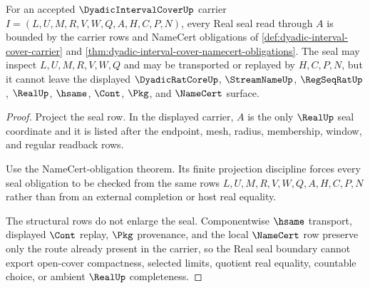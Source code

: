 \begin{theorem}
\label{thm:dyadic-interval-cover-real-seal-boundary}
For an accepted $\DyadicIntervalCoverUp$ carrier $I=(L,U,M,R,V,W,Q,A,H,C,P,N)$, every Real seal read through $A$ is bounded by the carrier rows and NameCert obligations of \autoref{def:dyadic-interval-cover-carrier} and \autoref{thm:dyadic-interval-cover-namecert-obligations}. The seal may inspect $L,U,M,R,V,W,Q$ and may be transported or replayed by $H,C,P,N$, but it cannot leave the displayed $\DyadicRatCoreUp$, $\StreamNameUp$, $\RegSeqRatUp$, $\RealUp$, $\hsame$, $\Cont$, $\Pkg$, and $\NameCert$ surface.
\end{theorem}
\begin{proof}
Project the seal row. In the displayed carrier, $A$ is the only $\RealUp$ seal coordinate and it is listed after the endpoint, mesh, radius, membership, window, and regular readback rows.

Use the NameCert-obligation theorem. Its finite projection discipline forces every seal obligation to be checked from the same rows $L,U,M,R,V,W,Q,A,H,C,P,N$ rather than from an external completion or host real equality.

The structural rows do not enlarge the seal. Componentwise $\hsame$ transport, displayed $\Cont$ replay, $\Pkg$ provenance, and the local $\NameCert$ row preserve only the route already present in the carrier, so the Real seal boundary cannot export open-cover compactness, selected limits, quotient real equality, countable choice, or ambient $\RealUp$ completeness.
\end{proof}

